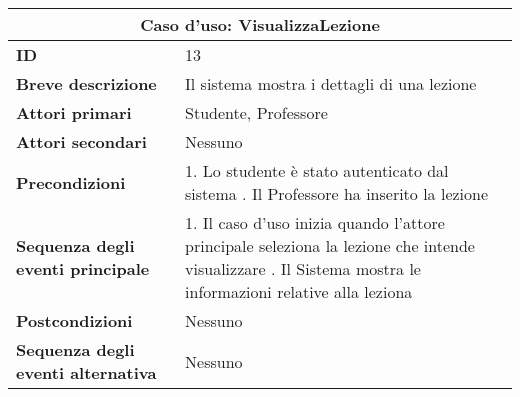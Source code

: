 \documentclass[11pt,a4paper]{report}
\begin{document}
\space{}


\begin{table}[h!]
\centering
\renewcommand{\arraystretch}{1.3}
\begin{tabular}{|p{4.2cm}|p{10.2cm}|}
\hline
\multicolumn{2}{|c|}{\textbf{Caso d’uso: VisualizzaLezione}} \\ \hline
\textbf{ID} & 13 \\ \hline
\textbf{Breve descrizione} & Il sistema mostra i dettagli di una lezione \\ \hline
\textbf{Attori primari} & Studente, Professore \\ \hline
\textbf{Attori secondari} & Nessuno \\ \hline
\textbf{Precondizioni} &
1. Lo studente è stato autenticato dal sistema \newline
2. Il Professore ha inserito la lezione \\ \hline
\textbf{Sequenza degli eventi principale} &
1. Il caso d’uso inizia quando l'attore principale seleziona la lezione che intende visualizzare \newline
2. Il Sistema mostra le informazioni relative alla leziona \\ \hline
\textbf{Postcondizioni} & Nessuno \\ \hline
\textbf{Sequenza degli eventi alternativa} & Nessuno \\ \hline
\end{tabular}
\end{table}

\newpage

\end{document}
